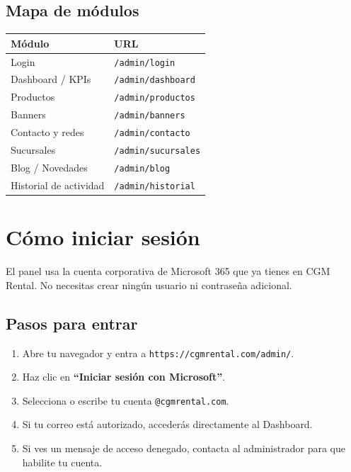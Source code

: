 \documentclass[11pt,a4paper]{article}
\begin{document}
\subsection{Mapa de módulos}

\begin{center}
\begin{tabular}{l l}
\toprule
\textbf{Módulo} & \textbf{URL} \\
\midrule
Login                       & \texttt{/admin/login}     \\
Dashboard / KPIs            & \texttt{/admin/dashboard} \\
Productos                   & \texttt{/admin/productos} \\
Banners                     & \texttt{/admin/banners}   \\
Contacto y redes            & \texttt{/admin/contacto}  \\
Sucursales                  & \texttt{/admin/sucursales} \\
Blog / Novedades            & \texttt{/admin/blog}      \\
Historial de actividad      & \texttt{/admin/historial} \\
\bottomrule
\end{tabular}
\end{center}

\section{Cómo iniciar sesión}
\label{sec:azure}

El panel usa la cuenta corporativa de Microsoft 365 que ya tienes en
CGM Rental. No necesitas crear ningún usuario ni contraseña adicional.

\subsection{Pasos para entrar}

\begin{enumerate}[leftmargin=*]
    \item Abre tu navegador y entra a
        \texttt{https://cgmrental.com/admin/}.
    \item Haz clic en \textbf{``Iniciar sesión con Microsoft''}.
    \item Selecciona o escribe tu cuenta \texttt{@cgmrental.com}.
    \item Si tu correo está autorizado, accederás directamente al
        Dashboard.
    \item Si ves un mensaje de acceso denegado, contacta al administrador
        para que habilite tu cuenta.
\end{enumerate}
\end{document}
